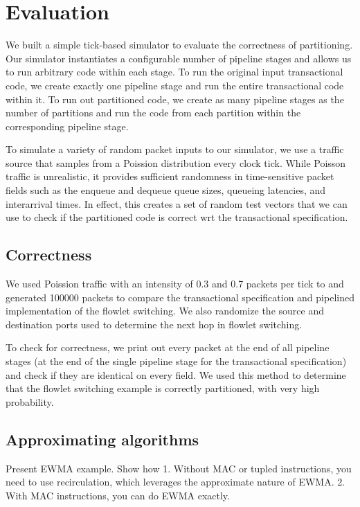 \section{Evaluation}
\label{s:evaluation}

We built a simple tick-based simulator to evaluate the correctness of
partitioning. Our simulator instantiates a configurable number of pipeline
stages and allows us to run arbitrary code within each stage. To run the
original input transactional code, we create exactly one pipeline stage and run
the entire transactional code within it. To run out partitioned code, we create
as many pipeline stages as the number of partitions and run the code from each
partition within the corresponding pipeline stage.

To simulate a variety of random packet inputs to our simulator, we use a
traffic source that samples from a Poission distribution every clock tick.
While Poisson traffic is unrealistic, it provides sufficient randomness in
time-sensitive packet fields such as the enqueue and dequeue queue sizes,
queueing latencies, and interarrival times. In effect, this creates a set of
random test vectors that we can use to check if the partitioned code is correct
wrt the transactional specification.

\subsection{Correctness}
\label{ss:correctness}

We used Poission traffic with an intensity of 0.3 and 0.7 packets per tick to
and generated 100000 packets to compare the transactional specification and
pipelined implementation of the flowlet switching. We also randomize the source
and destination ports used to determine the next hop in flowlet switching.

To check for correctness, we print out every packet at the end of all pipeline
stages (at the end of the single pipeline stage for the transactional
specification) and check if they are identical on every field. We used this
method to determine that the flowlet switching example is correctly
partitioned, with very high probability.

\subsection{Approximating algorithms}
Present EWMA example. Show how
1. Without MAC or tupled instructions, you need to use recirculation, which leverages the approximate nature of EWMA.
2. With MAC instructions, you can do EWMA exactly.

